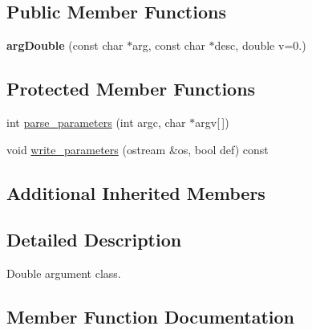 \subsection*{Public Member Functions}
\begin{DoxyCompactItemize}
\item 
{\bfseries arg\+Double} (const char $\ast$arg, const char $\ast$desc, double v=0.)\hypertarget{classclarg_1_1arg_double_adc69c6c39b2490368e6d93445275714e}{}\label{classclarg_1_1arg_double_adc69c6c39b2490368e6d93445275714e}

\end{DoxyCompactItemize}
\subsection*{Protected Member Functions}
\begin{DoxyCompactItemize}
\item 
int \hyperlink{classclarg_1_1arg_double_abdf04919fbed93b3255256a9e1e4faca}{parse\+\_\+parameters} (int argc, char $\ast$argv\mbox{[}$\,$\mbox{]})
\item 
void \hyperlink{classclarg_1_1arg_double_ad4968ff300091cc01022836310ee2383}{write\+\_\+parameters} (ostream \&os, bool def) const 
\end{DoxyCompactItemize}
\subsection*{Additional Inherited Members}


\subsection{Detailed Description}
Double argument class. 

\subsection{Member Function Documentation}
